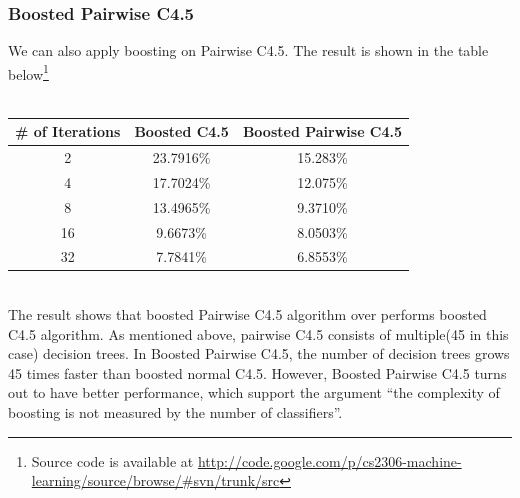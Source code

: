 \documentclass[a4paper,11pt]{article}
\begin{document}
\subsubsection{Boosted Pairwise C4.5}
We can also apply boosting on Pairwise C4.5. The result is shown in the table below\footnote{Source code is available at \url{http://code.google.com/p/cs2306-machine-learning/source/browse/#svn/trunk/src}}\\
\vspace{0.5cm}\\
\begin{tabular}{c c c}
\# of Iterations	& Boosted C4.5 & Boosted Pairwise C4.5\\
\hline \hline
	2		& 23.7916\% & 15.283\%  \\
	4		& 17.7024\% & 12.075\%  \\
	8		& 13.4965\% & 9.3710\%  \\
	16		& 9.6673\%  & 8.0503\%  \\
    32      & 7.7841\%  & 6.8553\%\\
\end{tabular}
\vspace{0.5cm}\\
The result shows that boosted Pairwise C4.5 algorithm over performs boosted C4.5 algorithm. As mentioned above, pairwise C4.5 consists of multiple(45 in this case) decision trees. In Boosted Pairwise C4.5, the number of decision trees grows 45 times faster than boosted normal C4.5. However, Boosted Pairwise C4.5 turns out to have better performance, which support the argument ``the complexity of boosting is not measured by the number of classifiers''.
\end{document}
